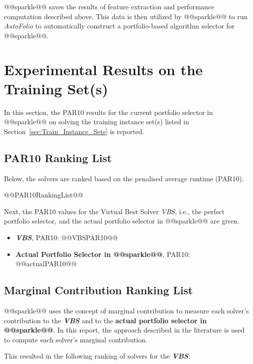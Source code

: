 \documentclass[british]{article}
\begin{document}
@@sparkle@@ saves the results of feature extraction and performance computation described above. This data is then utilized by @@sparkle@@ to run \emph{AutoFolio} \cite{LinEtAl15} to automatically construct a portfolio-based algorithm selector for @@sparkle@@.

\section{Experimental Results on the Training Set(s)}
\label{sec:Experimental_Results_Train}

In this section, the PAR10 results for the current portfolio selector in @@sparkle@@ on solving the training instance set(s) listed in Section~\ref{sec:Train_Instance_Sets} is reported.

\subsection{PAR10 Ranking List}
\label{sec:PAR10_Ranking}

Below, the solvers are ranked based on the penalised average runtime (PAR10).

\begin{enumerate}
@@PAR10RankingList@@
\end{enumerate}

Next, the PAR10 values for the Virtual Best Solver \emph{VBS}, i.e., the perfect portfolio selector, and the actual portfolio selector in @@sparkle@@ are given.

\begin{itemize}
\item \textbf{\emph{VBS}}, PAR10: @@VBSPAR10@@
\item \textbf{Actual Portfolio Selector in @@sparkle@@}, PAR10: @@actualPAR10@@
\end{itemize}

\subsection{Marginal Contribution Ranking List}
\label{sec:Marginal_Contribution_Ranking}

@@sparkle@@ uses the concept of marginal contribution \cite{XuEtAl12} to measure each solver's contribution to the \textbf{\emph{VBS}} and to the \textbf{actual portfolio selector in @@sparkle@@}. In this report, the approach described in the literature \cite{FreEtAl16} is used to compute each solver's marginal contribution.

This resulted in the following ranking of solvers for the \textbf{{\em VBS}}:
\end{document}
